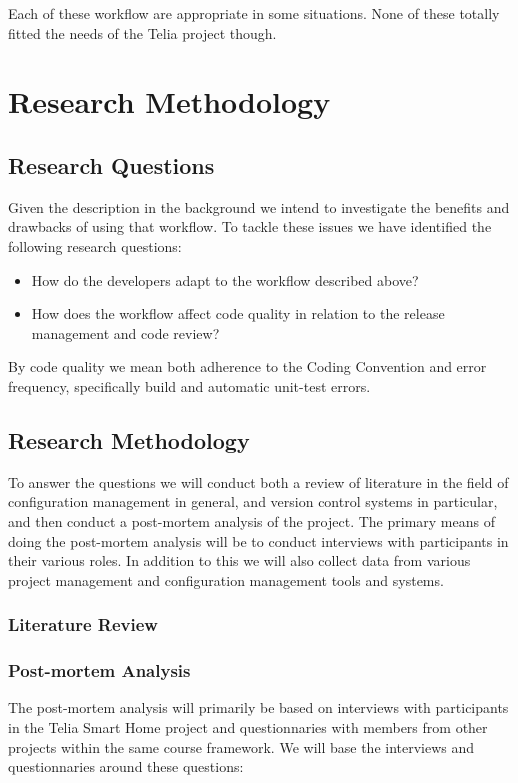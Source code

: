 \documentclass{article}
\begin{document}
Each of these workflow are appropriate in some situations. None of these
totally fitted the needs of the Telia project though.

\section{Research Methodology}

\subsection{Research Questions}
Given the description in the background we intend to investigate the
benefits and drawbacks of using that workflow. To tackle these issues
we have identified the following research questions:

\begin{itemize}
 \item How do the developers adapt to the workflow described above?
 \item How does the workflow affect code quality in relation to the
       release management and code review?
\end{itemize}

By code quality we mean both adherence to the Coding Convention and
error frequency, specifically build and automatic unit-test errors.

\subsection{Research Methodology}
To answer the questions we will conduct both a review of literature in
the field of configuration management in general, and version control
systems in particular, and then conduct a post-mortem analysis of the
project. The primary means of doing the post-mortem analysis will be
to conduct interviews with participants in their various roles. In
addition to this we will also collect data from various project
management and configuration management tools and systems.

\subsubsection{Literature Review}
\label{sec:litreview}

\subsubsection{Post-mortem Analysis}
The post-mortem analysis will primarily be based on interviews with
participants in the Telia Smart Home project and questionnaries with
members from other projects within the same course framework. We will
base the interviews and questionnaries around these questions:
\end{document}
